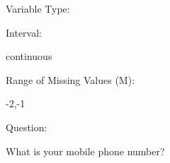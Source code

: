 \documentclass[
]{article}
\begin{document}
\begin{minipage}[t]{0.3\linewidth}

Variable Type:

\end{minipage}%
\begin{minipage}[t]{0.7\linewidth}

\end{minipage}

\begin{minipage}[t]{0.3\linewidth}

Interval:

\end{minipage}%
\begin{minipage}[t]{0.7\linewidth}

continuous

\end{minipage}

\begin{minipage}[t]{0.3\linewidth}

Range of Missing Values (M):

\end{minipage}%
\begin{minipage}[t]{0.7\linewidth}

-2,-1

\end{minipage}

\begin{minipage}[t]{0.3\linewidth}

Question:

\end{minipage}%
\begin{minipage}[t]{0.7\linewidth}

What is your mobile phone number?

\end{minipage}
\end{document}
